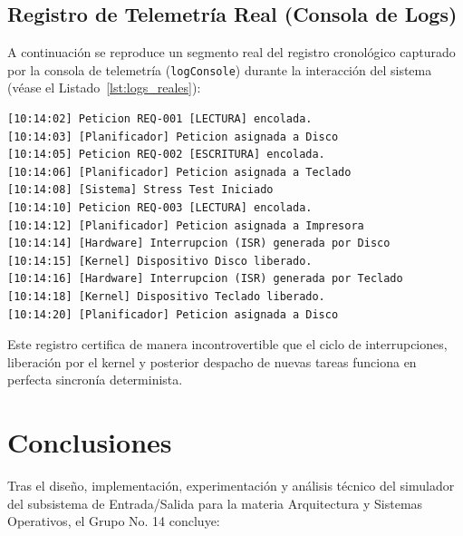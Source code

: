 \documentclass[11pt,letterpaper]{article}
\begin{document}
\subsection{Registro de Telemetría Real (Consola de Logs)}
A continuación se reproduce un segmento real del registro cronológico capturado por la consola de telemetría (\texttt{logConsole}) durante la interacción del sistema (véase el Listado~\ref{lst:logs_reales}):

\begin{lstlisting}[caption={Segmento de registro de telemetría extraído de la consola del sistema}, label={lst:logs_reales}]
[10:14:02] Peticion REQ-001 [LECTURA] encolada.
[10:14:03] [Planificador] Peticion asignada a Disco
[10:14:05] Peticion REQ-002 [ESCRITURA] encolada.
[10:14:06] [Planificador] Peticion asignada a Teclado
[10:14:08] [Sistema] Stress Test Iniciado
[10:14:10] Peticion REQ-003 [LECTURA] encolada.
[10:14:12] [Planificador] Peticion asignada a Impresora
[10:14:14] [Hardware] Interrupcion (ISR) generada por Disco
[10:14:15] [Kernel] Dispositivo Disco liberado.
[10:14:16] [Hardware] Interrupcion (ISR) generada por Teclado
[10:14:18] [Kernel] Dispositivo Teclado liberado.
[10:14:20] [Planificador] Peticion asignada a Disco
\end{lstlisting}

Este registro certifica de manera incontrovertible que el ciclo de interrupciones, liberación por el kernel y posterior despacho de nuevas tareas funciona en perfecta sincronía determinista.

\section{Conclusiones}

Tras el diseño, implementación, experimentación y análisis técnico del simulador del subsistema de Entrada/Salida para la materia Arquitectura y Sistemas Operativos, el Grupo No. 14 concluye:
\end{document}
